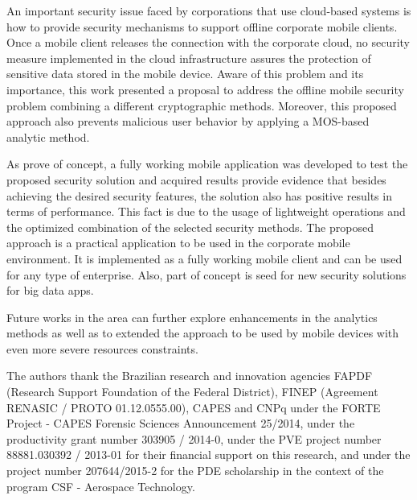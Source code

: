 \documentclass[twocolumn]{svjour3}          	%
\begin{document}
An important security issue faced by corporations that use cloud-based systems is how to provide security mechanisms to support offline corporate mobile clients. Once a mobile client releases the connection with the corporate cloud, no security measure implemented in the cloud infrastructure assures the protection of sensitive data stored in the mobile device. Aware of this problem and its importance, this work presented a proposal to address the offline mobile security problem combining a different cryptographic methods. Moreover, this proposed approach also prevents malicious user behavior by applying a MOS-based analytic method. 

As prove of concept, a fully working mobile application was developed to test the proposed security solution and acquired results provide evidence that besides achieving the desired security features, the solution also has positive results in terms of performance. This fact is due to the usage of lightweight operations and the optimized combination of the selected security methods. The proposed approach is a practical application to be used in the corporate mobile environment. It is implemented as a fully working mobile client and can be used for any type of enterprise. Also, part of concept is seed for new security solutions for big data apps. 

Future works in the area can further explore enhancements in the analytics methods as well as to extended the approach to be used by mobile devices with even more severe resources constraints.

\begin{acknowledgements}
The authors thank the Brazilian research and innovation agencies FAPDF (Research Support Foundation of the Federal District), FINEP (Agreement RENASIC / PROTO 01.12.0555.00), CAPES and CNPq under the FORTE Project - CAPES Forensic Sciences Announcement 25/2014, under the productivity grant number 303905 / 2014-0, under the PVE project number 88881.030392 / 2013-01 for their financial support on this research, and under the project number 207644/2015-2 for the PDE scholarship in the context of the program CSF - Aerospace Technology.\end{acknowledgements}

\end{document}

